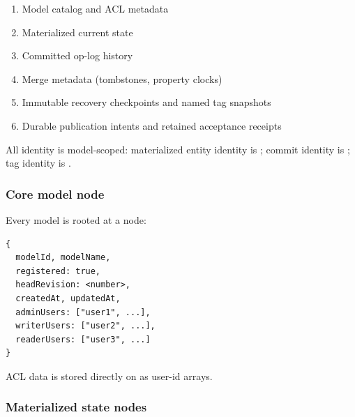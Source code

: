 \begin{enumerate}
\item Model catalog and ACL metadata
\item Materialized current state
\item Committed op-log history
\item Merge metadata (tombstones, property clocks)
\item Immutable recovery checkpoints and named tag snapshots
\item Durable publication intents and retained acceptance receipts
\end{enumerate}

All identity is model-scoped: materialized entity identity is
; commit identity is ;
tag identity is .

\subsubsection{Core model node}

Every model is rooted at a  node:

\begin{lstlisting}[caption={Model node properties}]
{
  modelId, modelName,
  registered: true,
  headRevision: <number>,
  createdAt, updatedAt,
  adminUsers: ["user1", ...],
  writerUsers: ["user2", ...],
  readerUsers: ["user3", ...]
}
\end{lstlisting}

ACL data is stored directly on  as user-id arrays.

\subsubsection{Materialized state nodes}

